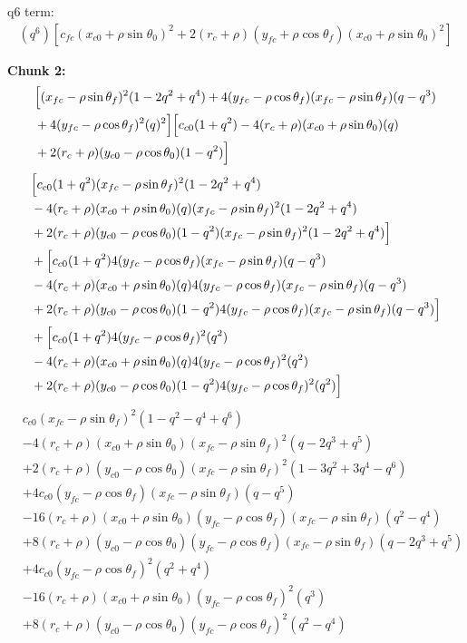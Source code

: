 \documentclass[12pt]{article}
\begin{document}
q6 term:
\begin{align*}
    (q^6)[c_{fc}(x_{c0} + \rho\sin\theta_0)^2 +2(r_c+\rho)(y_{fc} + \rho\cos\theta_f)(x_{c0} + \rho\sin\theta_0)^2]
\end{align*}


\textbf{Chunk 2:}
\begin{align*}
    &\Bigl[ (x_{fc} - \rho\sin\theta_f)^2(1-2q^2 + q^4) + 4(y_{fc} - \rho\cos\theta_f)(x_{fc} - \rho\sin\theta_f)(q-q^3)\\&+ 4(y_{fc} - \rho\cos\theta_f)^2(q)^2 \Bigr] \Bigl[ c_{c0}(1 + q^2) - 4(r_c+\rho)(x_{c0} +\rho\sin\theta_0)(q)\\
    &+ 2(r_c+\rho)(y_{c0} - \rho\cos\theta_0)(1 - q^2) \Bigr]
\end{align*}
\begin{align*}
    &\Bigl[ c_{c0}(1 + q^2)(x_{fc} - \rho\sin\theta_f)^2(1-2q^2 + q^4)\\
    &- 4(r_c+\rho)(x_{c0} +\rho\sin\theta_0)(q)(x_{fc} - \rho\sin\theta_f)^2(1-2q^2 + q^4)\\
    &+ 2(r_c+\rho)(y_{c0} - \rho\cos\theta_0)(1 - q^2)(x_{fc} - \rho\sin\theta_f)^2(1-2q^2 + q^4) \Bigr]\\
    &+ \Bigl[ c_{c0}(1 + q^2)4(y_{fc} - \rho\cos\theta_f)(x_{fc} - \rho\sin\theta_f)(q-q^3)\\ &- 4(r_c+\rho)(x_{c0} +\rho\sin\theta_0)(q)4(y_{fc} - \rho\cos\theta_f)(x_{fc} - \rho\sin\theta_f)(q-q^3)\\
    &+ 2(r_c+\rho)(y_{c0} - \rho\cos\theta_0)(1 - q^2)4(y_{fc} - \rho\cos\theta_f)(x_{fc} - \rho\sin\theta_f)(q-q^3) \Bigr]\\
    &+ \Bigl[ c_{c0}(1 + q^2)4(y_{fc} - \rho\cos\theta_f)^2(q^2)\\
    &- 4(r_c+\rho)(x_{c0} +\rho\sin\theta_0)(q)4(y_{fc} - \rho\cos\theta_f)^2(q^2)\\
    &+ 2(r_c+\rho)(y_{c0} - \rho\cos\theta_0)(1 - q^2)4(y_{fc} - \rho\cos\theta_f)^2(q^2) \Bigr]
\end{align*}
\begin{align*}
    &c_{c0}(x_{fc} - \rho\sin\theta_f)^2(1-q^2 -q^4 + q^6)\\
    &- 4(r_c+\rho)(x_{c0} +\rho\sin\theta_0)(x_{fc} - \rho\sin\theta_f)^2(q-2q^3 + q^5)\\
    &+ 2(r_c+\rho)(y_{c0} - \rho\cos\theta_0)(x_{fc} - \rho\sin\theta_f)^2(1-3q^2 +3q^4 - q^6) \\
    &+ 4c_{c0}(y_{fc} - \rho\cos\theta_f)(x_{fc} - \rho\sin\theta_f)(q-q^5)\\
    &- 16(r_c+\rho)(x_{c0} +\rho\sin\theta_0)(y_{fc} - \rho\cos\theta_f)(x_{fc} - \rho\sin\theta_f)(q^2-q^4)\\
    &+ 8(r_c+\rho)(y_{c0} - \rho\cos\theta_0)(y_{fc} - \rho\cos\theta_f)(x_{fc} - \rho\sin\theta_f)(q -2q^3 +q^5)\\
    &+ 4c_{c0}(y_{fc} - \rho\cos\theta_f)^2(q^2 + q^4)\\
    &- 16(r_c+\rho)(x_{c0} +\rho\sin\theta_0)(y_{fc} - \rho\cos\theta_f)^2(q^3)\\
    &+ 8(r_c+\rho)(y_{c0} - \rho\cos\theta_0)(y_{fc} - \rho\cos\theta_f)^2(q^2 - q^4)
\end{align*}
\end{document}

